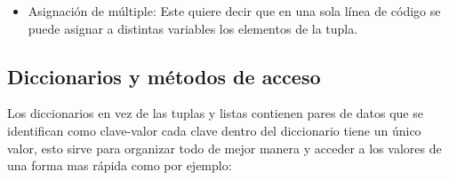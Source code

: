 \begin{itemize}
    \item Asignación de múltiple: Este quiere decir que en una sola línea de código se puede asignar a distintas variables los elementos de la tupla. 
    \begin{figure}[h]
        \centering
      \end{figure}

\end{itemize}
\newpage

\subsection{Diccionarios y métodos de acceso}
Los diccionarios en vez de las tuplas y listas contienen pares de datos que se identifican como clave-valor cada clave dentro del diccionario tiene un único valor, esto sirve para organizar todo de mejor manera y acceder a los valores de una forma mas rápida como por ejemplo:

